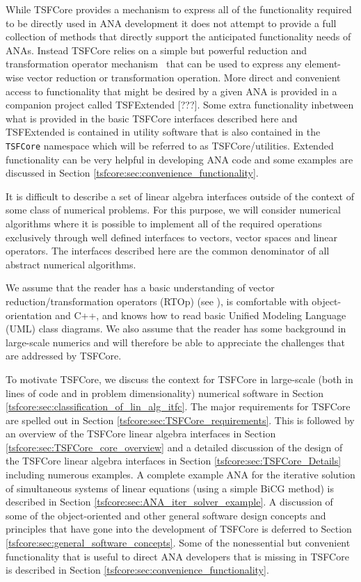 While TSFCore provides a mechanism to express all of the functionality
required to be directly used in ANA development it does not attempt to
provide a full collection of methods that directly support the
anticipated functionality needs of ANAs.  Instead TSFCore relies on a
simple but powerful reduction and transformation operator
mechanism~\cite{ref:rtop_toms} that can be used to express any
element-wise vector reduction or transformation operation.  More
direct and convenient access to functionality that might be desired by
a given ANA is provided in a companion project called TSFExtended
[???].  Some extra functionality inbetween what is provided in the
basic TSFCore interfaces described here and TSFExtended is contained
in utility software that is also contained in the {}\texttt{TSFCore}
namespace which will be referred to as TSFCore/utilities.  Extended
functionality can be very helpful in developing ANA code and some
examples are discussed in Section
{}\ref{tsfcore:sec:convenience_functionality}.

It is difficult to describe a set of linear algebra interfaces outside
of the context of some class of numerical problems.  For this purpose,
we will consider numerical algorithms where it is possible to
implement all of the required operations exclusively through well
defined interfaces to vectors, vector spaces and linear operators.
The interfaces described here are the common denominator of all
abstract numerical algorithms.

We assume that the reader has a basic understanding of vector
reduction/transformation operators (RTOp) (see
{}\cite{ref:rtop_toms}), is comfortable with object-orientation
{}\cite{ref:gama_et_al_1995} and C++, and knows how to read basic
Unified Modeling Language (UML) {}\cite{ref:uml_distilled_2nd_ed}
class diagrams.  We also assume that the reader has some background in
large-scale numerics and will therefore be able to appreciate the
challenges that are addressed by TSFCore.

To motivate TSFCore, we discuss the context for TSFCore in large-scale
(both in lines of code and in problem dimensionality) numerical
software in Section
{}\ref{tsfcore:sec:classification_of_lin_alg_itfc}.  The major
requirements for TSFCore are spelled out in Section
{}\ref{tsfcore:sec:TSFCore_requirements}.  This is followed by an
overview of the TSFCore linear algebra interfaces in Section
{}\ref{tsfcore:sec:TSFCore_core_overview} and a detailed discussion of
the design of the TSFCore linear algebra interfaces in Section
{}\ref{tsfcore:sec:TSFCore_Details} including numerous examples.  A
complete example ANA for the iterative solution of simultaneous
systems of linear equations (using a simple BiCG method) is described
in Section {}\ref{tsfcore:sec:ANA_iter_solver_example}.  A discussion
of some of the object-oriented and other general software design
concepts and principles that have gone into the development of TSFCore
is deferred to Section {}\ref{tsfcore:sec:general_software_concepts}.
Some of the nonessential but convenient functionality that is useful
to direct ANA developers that is missing in TSFCore is described in
Section {}\ref{tsfcore:sec:convenience_functionality}.

